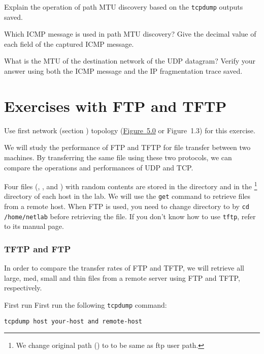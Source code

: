 \documentclass{../UTNetLab}
\begin{document}
    \begin{report}
        \item Explain the operation of path MTU discovery based on the \lstinline{tcpdump} outputs saved.
        
        \item Which ICMP message is used in path MTU discovery? Give the decimal value of each field of the captured ICMP message.
        
        \item What is the MTU of the destination network of the UDP datagram? Verify your answer using both the ICMP message and the IP fragmentation trace saved.
    \end{report}

\part{Exercises with FTP and TFTP}
    Use first network (section ) topology (\hyperref[fig:5.0]{Figure~5.0} or Figure~1.3) for this exercise.

    We will study the performance of FTP and TFTP for file transfer between two machines.
    By transferring the same file using these two protocols, we can compare the operations and performances of UDP and TCP.

    Four files (, ,  and ) with random contents are stored in the  directory and in the \footnote{We change original path () to  to be same as ftp user path.} directory of each host in the lab.
    We will use the \lstinline{get} command to retrieve files from a remote host.
    When FTP is used, you need to change directory to  by \lstinline{cd /home/netlab} before retrieving the file.
    If you don’t know how to use \lstinline{tftp}, refer to its manual page.


\section{TFTP and FTP}
    In order to compare the transfer rates of FTP and TFTP, we will retrieve all large, med, small and thin files from a remote server using FTP and TFTP, respectively.

    First run First run the following \lstinline{tcpdump} command:
    \begin{lstlisting}[emph={your-host,remote-host},morekeywords={[3]host,and}]
tcpdump host your-host and remote-host
    \end{lstlisting}
\end{document}
